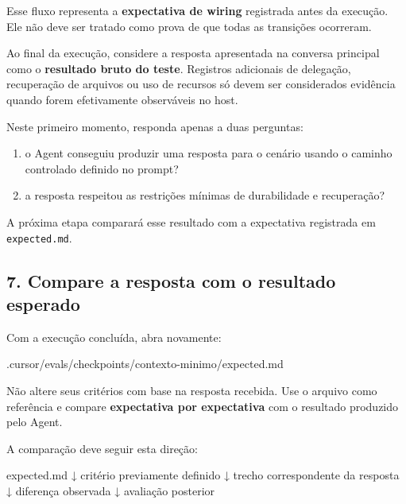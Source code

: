 \documentclass[
  10pt,
  a4paper,
  oneside]{book}
\newenvironment{Shaded}{}{}
\newcommand{\NormalTok}[1]{#1}
\providecommand{\tightlist}{%
  \setlength{\itemsep}{0pt}\setlength{\parskip}{0pt}}
\renewenvironment{Shaded}{\begin{snugshade}}{\end{snugshade}}%
\begin{document}
Esse fluxo representa a \textbf{expectativa de wiring} registrada antes
da execução. Ele não deve ser tratado como prova de que todas as
transições ocorreram.

Ao final da execução, considere a resposta apresentada na conversa
principal como o \textbf{resultado bruto do teste}. Registros adicionais
de delegação, recuperação de arquivos ou uso de recursos só devem ser
considerados evidência quando forem efetivamente observáveis no host.

Neste primeiro momento, responda apenas a duas perguntas:

\begin{enumerate}
\def\labelenumi{\arabic{enumi}.}
\tightlist
\item
  o Agent conseguiu produzir uma resposta para o cenário usando o
  caminho controlado definido no prompt?
\item
  a resposta respeitou as restrições mínimas de durabilidade e
  recuperação?
\end{enumerate}

A próxima etapa comparará esse resultado com a expectativa registrada em
\texttt{expected.md}.

\hypertarget{compare-a-resposta-com-o-resultado-esperado}{%
\subsection{7. Compare a resposta com o resultado
esperado}\label{compare-a-resposta-com-o-resultado-esperado}}

Com a execução concluída, abra novamente:

\begin{Shaded}
\begin{Highlighting}[]
\NormalTok{.cursor/evals/checkpoints/contexto{-}minimo/expected.md}
\end{Highlighting}
\end{Shaded}

Não altere seus critérios com base na resposta recebida. Use o arquivo
como referência e compare \textbf{expectativa por expectativa} com o
resultado produzido pelo Agent.

A comparação deve seguir esta direção:

\begin{Shaded}
\begin{Highlighting}[]
\NormalTok{expected.md}
\NormalTok{    ↓}
\NormalTok{critério previamente definido}
\NormalTok{    ↓}
\NormalTok{trecho correspondente da resposta}
\NormalTok{    ↓}
\NormalTok{diferença observada}
\NormalTok{    ↓}
\NormalTok{avaliação posterior}
\end{Highlighting}
\end{Shaded}
\end{document}

